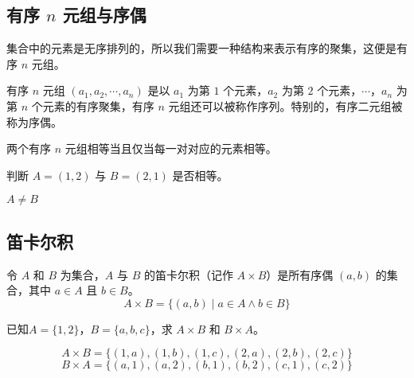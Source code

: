 \subsection{有序 $n$ 元组与序偶}
集合中的元素是无序排列的，所以我们需要一种结构来表示有序的聚集，这便是有序 $n$ 元组。
\begin{definition}[有序 $n$ 元组与序偶]\label{def:有序n元组与序偶}
    有序 $n$ 元组 $(a_1, a_2, \cdots, a_n)$ 是以 $a_1$ 为第 $1$ 个元素，$a_2$ 为第 $2$ 个元素，$\cdots$，$a_n$ 为第 $n$ 个元素的有序聚集，有序 $n$ 元组还可以被称作序列。特别的，有序二元组被称为序偶。
\end{definition}

两个有序 $n$ 元组相等当且仅当每一对对应的元素相等。
\begin{collections}
    \begin{example}
        判断 $A=(1, 2)$ 与 $B=(2, 1)$ 是否相等。
    \end{example}
    \begin{solution}
        $A \neq B$
    \end{solution}
\end{collections}

\subsection{笛卡尔积}
\begin{definition}[笛卡尔积]\label{def:笛卡尔积}
    令 $A$ 和 $B$ 为集合，$A$ 与 $B$ 的笛卡尔积（记作 $A \times B$）是所有序偶 $(a,b)$ 的集合，其中 $a \in A$ 且 $b \in B$。
    \begin{equation*}
        A \times B = \{(a,b) \mid a \in A \land b \in B \}
    \end{equation*}
\end{definition}

\begin{collections}
    \begin{example}
        已知$A = \{1, 2\}$，$B = \{a, b, c\}$，求 $A \times B$ 和 $B \times A$。
    \end{example}
    \begin{solution}
        $$A \times B = \{(1, a), (1, b), (1, c), (2, a), (2, b), (2, c)\}$$
        $$B \times A = \{(a, 1), (a, 2), (b, 1), (b, 2), (c, 1), (c, 2)\}$$
    \end{solution}
\end{collections}
